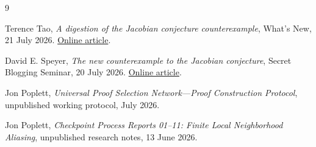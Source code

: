 \documentclass[11pt,letterpaper]{article}
\theoremstyle{jgpplain}
\begin{document}

\begin{thebibliography}{9}

Terence Tao,
\emph{A digestion of the Jacobian conjecture counterexample},
What's New, 21 July 2026.
\href{https://terrytao.wordpress.com/2026/07/21/a-digestion-of-the-jacobian-conjecture-counterexample/}{Online article}.

David E. Speyer,
\emph{The new counterexample to the Jacobian conjecture},
Secret Blogging Seminar, 20 July 2026.
\href{https://sbseminar.wordpress.com/2026/07/20/the-new-counterexample-to-the-jacobian-conjecture/}{Online article}.

Jon Poplett,
\emph{Universal Proof Selection Network---Proof Construction Protocol},
unpublished working protocol, July 2026.

Jon Poplett,
\emph{Checkpoint Process Reports 01--11: Finite Local Neighborhood Aliasing},
unpublished research notes, 13 June 2026.

\end{thebibliography}
\end{document}
